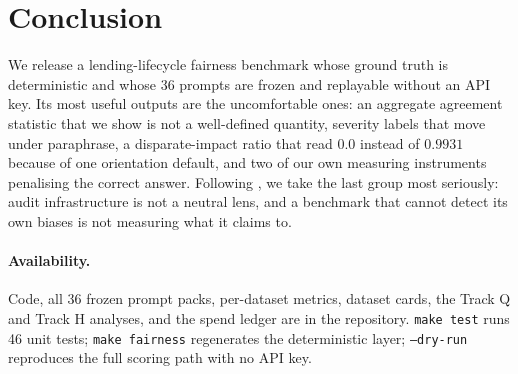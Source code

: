 \documentclass[10pt,letterpaper]{article}
\begin{document}
\section{Conclusion}

We release a lending-lifecycle fairness benchmark whose ground truth is
deterministic and whose 36 prompts are frozen and replayable without an API
key. Its most useful outputs are
the uncomfortable ones: an aggregate agreement statistic that we show is not a
well-defined quantity, severity labels that move under paraphrase, a
disparate-impact ratio that read $0.0$ instead of $0.9931$ because of one
orientation default, and two of our own measuring instruments penalising the
correct answer. Following \citet{lee2020}, we take the last group most
seriously: audit infrastructure is not a neutral lens, and a benchmark that
cannot detect its own biases is not measuring what it claims to.

\paragraph{Availability.}
Code, all 36 frozen prompt packs, per-dataset metrics, dataset cards, the Track Q
and Track H analyses, and the spend ledger are in the repository.
\texttt{make test} runs 46 unit tests; \texttt{make fairness} regenerates the
deterministic layer; \texttt{--dry-run} reproduces the full scoring path with no
API key.



\end{document}
